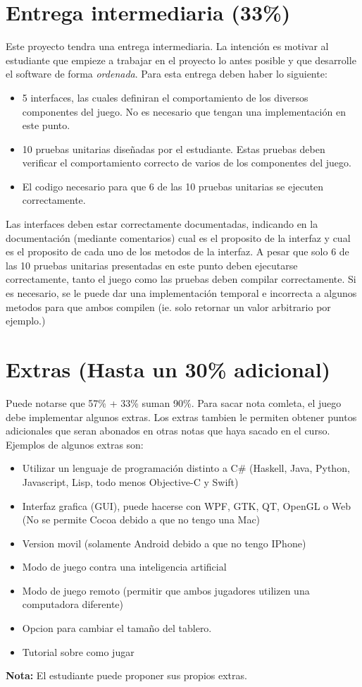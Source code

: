 \documentclass{article}
\begin{document}
\section*{Entrega intermediaria (33\%)}
Este proyecto tendra una entrega intermediaria. La intenci\'on es
motivar al estudiante que empieze a trabajar en el proyecto lo antes
posible y que desarrolle el software de forma \emph{ordenada}. Para
esta entrega deben haber lo siguiente:
\begin{itemize}
        \item{5 interfaces, las cuales definiran el comportamiento
        de los diversos componentes del juego. No es necesario que
        tengan una implementaci\'on en este punto.}
        \item{10 pruebas unitarias dise\~nadas por el estudiante.
        Estas pruebas deben verificar el comportamiento correcto
        de varios de los componentes del juego.}
        \item{El codigo necesario para que 6 de las 10
        pruebas unitarias se ejecuten correctamente.}
\end{itemize}
Las interfaces deben estar correctamente documentadas, indicando
en la documentaci\'on (mediante comentarios) cual es el proposito
de la interfaz y cual es el proposito de cada uno de los metodos
de la interfaz. A pesar que solo 6 de las 10 pruebas unitarias
presentadas en este punto deben ejecutarse correctamente, tanto
el juego como las pruebas deben compilar correctamente. Si es
necesario, se le puede dar una implementaci\'on temporal e
incorrecta a algunos metodos para que ambos compilen (ie.
solo retornar un valor arbitrario por ejemplo.)

\section*{Extras (Hasta un 30\% adicional)}
Puede notarse que 57\% + 33\% suman 90\%. Para sacar nota comleta,
el juego debe implementar algunos extras. Los extras tambien le
permiten obtener puntos adicionales que seran abonados en otras
notas que haya sacado en el curso. Ejemplos de algunos extras son:
\begin{itemize}
        \item{Utilizar un lenguaje de programaci\'on distinto a C\#
        (Haskell, Java, Python, Javascript, Lisp, todo menos Objective-C y Swift)}
        \item{Interfaz grafica (GUI), puede hacerse con WPF, GTK, QT, OpenGL o Web
        (No se permite Cocoa debido a que no tengo una Mac)}
        \item{Version movil (solamente Android debido a que no tengo IPhone)}
        \item{Modo de juego contra una inteligencia artificial}
        \item{Modo de juego remoto (permitir que ambos jugadores
        utilizen una computadora diferente)}
        \item{Opcion para cambiar el tama\~no del tablero.}
        \item{Tutorial sobre como jugar}
\end{itemize}
{\bf Nota:} El estudiante puede proponer sus propios extras.
\end{document}
